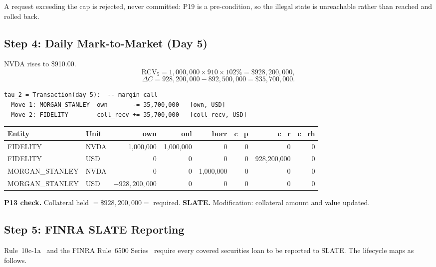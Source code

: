 \documentclass[11pt,a4paper]{article}
\begin{document}
\noindent A request exceeding the cap is rejected, never committed: P19 is a pre-condition, so the illegal state is unreachable rather than reached and rolled back.

\subsection{Step 4: Daily Mark-to-Market (Day 5)}
\label{sec:us-step4}

NVDA rises to \$910.00.
\[
\mathrm{RCV}_5 = 1{,}000{,}000 \times 910 \times 102\% = \$928{,}200{,}000,
\]
\[
\Delta C = 928{,}200{,}000 - 892{,}500{,}000 = \$35{,}700{,}000.
\]

\begin{lstlisting}
tau_2 = Transaction(day 5):  -- margin call
  Move 1: MORGAN_STANLEY  own       -= 35,700,000   [own, USD]
  Move 2: FIDELITY        coll_recv += 35,700,000   [coll_recv, USD]
\end{lstlisting}

\begin{center}\small
\begin{tabular}{l l r r r r r r}
\toprule
\textbf{Entity} & \textbf{Unit} & own & onl & borr & c\_p & c\_r & c\_rh \\
\midrule
FIDELITY & NVDA & 1{,}000{,}000 & 1{,}000{,}000 & 0 & 0 & 0 & 0 \\
FIDELITY & USD & 0 & 0 & 0 & 0 & 928{,}200{,}000 & 0 \\
\midrule
MORGAN\_STANLEY & NVDA & 0 & 0 & 1{,}000{,}000 & 0 & 0 & 0 \\
MORGAN\_STANLEY & USD & $-928{,}200{,}000$ & 0 & 0 & 0 & 0 & 0 \\
\bottomrule
\end{tabular}
\end{center}

\noindent\textbf{P13 check.} Collateral held $= \$928{,}200{,}000 =$ required. \checkmark\quad
\textbf{SLATE.} Modification: collateral amount and value updated.

\subsection{Step 5: FINRA SLATE Reporting}
\label{sec:us-step5}

Rule~10c-1a~\cite{sec10c1a} and the FINRA Rule~6500 Series~\cite{finra6500} require every covered securities loan to be reported to SLATE. The lifecycle maps as follows.
\end{document}
